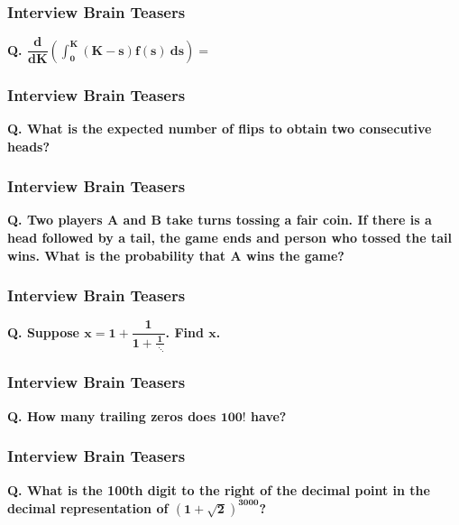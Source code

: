 \documentclass{beamer}
\begin{document}
\begin{frame}[t]
\frametitle{Interview Brain Teasers}
{\bf Q. $\boldsymbol{\dfrac{d}{dK}\left(\displaystyle\int_0^K (K - s) f(s)\ ds\right) = }$}

\end{frame}

\begin{frame}[t]
\frametitle{Interview Brain Teasers}
{\bf Q. What is the expected number of flips to obtain two consecutive heads?}

\end{frame}

\begin{frame}[t]
\frametitle{Interview Brain Teasers}
{\bf Q. Two players A and B take turns tossing a fair coin. If there is a head followed by a tail, the game ends and person who tossed the tail wins. What is the probability that A wins the game?}

\end{frame}

\begin{frame}[t]
\frametitle{Interview Brain Teasers}
{\bf Q. Suppose $\boldsymbol{ x = 1 + \dfrac{1}{1 + \frac{1}{\; \ddots}}}$. Find $\boldsymbol{x}$.}

\end{frame}

\begin{frame}[t]
\frametitle{Interview Brain Teasers}
{\bf Q. How many trailing zeros does $\boldsymbol{100!}$ have?}

\end{frame}


\begin{frame}[t]
\frametitle{Interview Brain Teasers}
{\bf Q. What is the 100th digit to the right of the decimal point in the decimal representation of $\boldsymbol{(1 + \sqrt{2})^{3000}}$?}

\end{frame}
\end{document}
